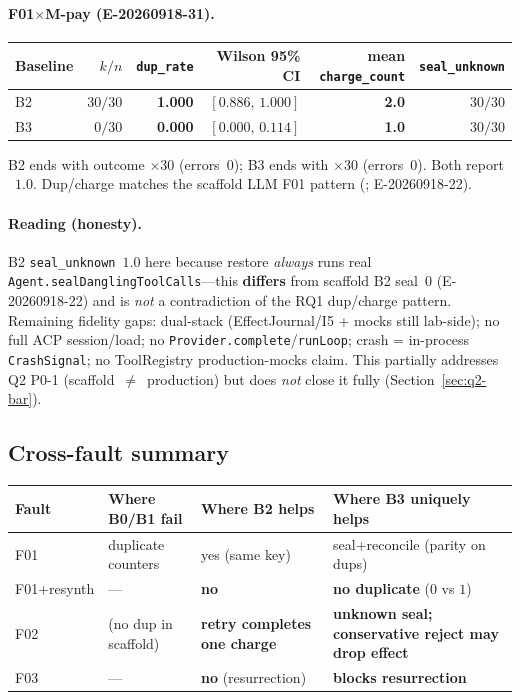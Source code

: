 \documentclass[11pt,a4paper]{article}
\begin{document}
\paragraph{F01$\times$M-pay (E-20260918-31).}
\begin{center}
\small
\begin{tabular}{@{}lrrrrr@{}}
\toprule
Baseline & $k/n$ & \texttt{dup\_rate} & Wilson 95\% CI &
  mean \texttt{charge\_count} & \texttt{seal\_unknown} \\
\midrule
B2 & $30/30$ & \textbf{1.000} & $[0.886,\,1.000]$ & \textbf{2.0} & $30/30$ \\
B3 & $0/30$ & \textbf{0.000} & $[0.000,\,0.114]$ & \textbf{1.0} & $30/30$ \\
\bottomrule
\end{tabular}
\end{center}
B2 ends with outcome $\times 30$
(errors~$0$); B3 ends with $\times 30$
(errors~$0$).
Both report ~$1.0$.
Dup/charge matches the scaffold LLM F01 pattern
(; E-20260918-22).

\paragraph{Reading (honesty).}
B2 \texttt{seal\_unknown}~$1.0$ here because restore \emph{always} runs
real \texttt{Agent.sealDanglingToolCalls}---this \textbf{differs} from
scaffold B2 seal~$0$ (E-20260918-22) and is \emph{not} a contradiction of
the RQ1 dup/charge pattern. Remaining fidelity gaps: dual-stack
(EffectJournal/I5 + mocks still lab-side); no full ACP session/load; no
\texttt{Provider.complete}/\texttt{runLoop}; crash = in-process
\texttt{CrashSignal}; no ToolRegistry production-mocks claim.
This partially addresses Q2 P0-1 (scaffold~$\neq$~production) but does
\emph{not} close it fully (Section~\ref{sec:q2-bar}).

\subsection{Cross-fault summary}

\begin{center}
\begin{tabular}{@{}llll@{}}
\toprule
Fault & Where B0/B1 fail & Where B2 helps & Where B3 uniquely helps \\
\midrule
F01 & duplicate counters & yes (same key) &
  seal+reconcile (parity on dups) \\
F01+resynth & --- & \textbf{no} &
  \textbf{no duplicate} ($0$ vs $1$) \\
F02 & (no dup in scaffold) & \textbf{retry completes one charge} &
  \textbf{unknown seal; conservative reject may drop effect} \\
F03 & --- & \textbf{no} (resurrection) &
  \textbf{blocks resurrection} \\
\bottomrule
\end{tabular}
\end{center}
\end{document}
